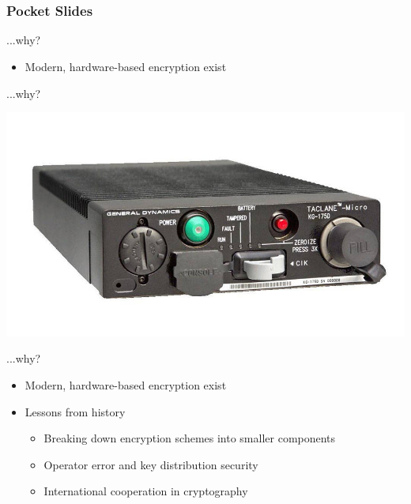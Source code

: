 \documentclass[hyphens,aspectratio=169]{beamer}
\begin{document}
\part{}
\section{Pocket Slides}





\begin{frame}[fragile]{...why?}
\begin{itemize}
    \item Modern, hardware-based encryption exist
\end{itemize}
\end{frame}

\begin{frame}[fragile]{...why?}
\begin{center}
    \includegraphics[scale=0.3]{paper/images/taclane.jpg}
\end{center}
\end{frame}

\begin{frame}[fragile]{...why?}
\begin{itemize}
    \item  Modern, hardware-based encryption exist
    \vspace{1em}
        \item Lessons from history
        \begin{itemize}
            \item Breaking down encryption schemes into smaller components
            \item Operator error and key distribution security 
            \item International cooperation in cryptography
        \end{itemize}
\end{itemize}
\end{frame}
\end{document}
